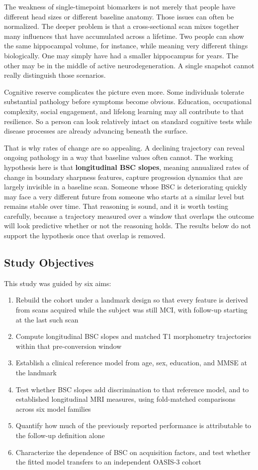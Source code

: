 \documentclass[blue]{ludusofficial}  %
\begin{document}
The weakness of single-timepoint biomarkers is not merely that people have different head sizes or different baseline anatomy. Those issues can often be normalized. The deeper problem is that a cross-sectional scan mixes together many influences that have accumulated across a lifetime. Two people can show the same hippocampal volume, for instance, while meaning very different things biologically. One may simply have had a smaller hippocampus for years. The other may be in the middle of active neurodegeneration. A single snapshot cannot really distinguish those scenarios.

Cognitive reserve complicates the picture even more. Some individuals tolerate substantial pathology before symptoms become obvious. Education, occupational complexity, social engagement, and lifelong learning may all contribute to that resilience. So a person can look relatively intact on standard cognitive tests while disease processes are already advancing beneath the surface.

That is why rates of change are so appealing. A declining trajectory can reveal ongoing pathology in a way that baseline values often cannot. The working hypothesis here is that \textbf{longitudinal BSC slopes}, meaning annualized rates of change in boundary sharpness features, capture progression dynamics that are largely invisible in a baseline scan. Someone whose BSC is deteriorating quickly may face a very different future from someone who starts at a similar level but remains stable over time. That reasoning is sound, and it is worth testing carefully, because a trajectory measured over a window that overlaps the outcome will look predictive whether or not the reasoning holds. The results below do not support the hypothesis once that overlap is removed.

\subsection{Study Objectives}

This study was guided by six aims:

\begin{enumerate}
    \item Rebuild the cohort under a landmark design so that every feature is derived from scans acquired while the subject was still MCI, with follow-up starting at the last such scan
    \item Compute longitudinal BSC slopes and matched T1 morphometry trajectories within that pre-conversion window
    \item Establish a clinical reference model from age, sex, education, and MMSE at the landmark
    \item Test whether BSC slopes add discrimination to that reference model, and to established longitudinal MRI measures, using fold-matched comparisons across six model families
    \item Quantify how much of the previously reported performance is attributable to the follow-up definition alone
    \item Characterize the dependence of BSC on acquisition factors, and test whether the fitted model transfers to an independent OASIS-3 cohort
\end{enumerate}
\end{document}
